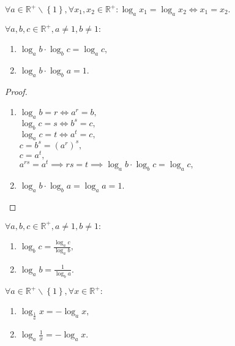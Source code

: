 \begin{veta}\label{zakl_reseni}
    $\forall a \in \mathbb R^+ \smallsetminus \left \{ 1 \right \},
    \forall x_1, x_2\in \mathbb R^+: \log_a x_1 = \log_a x_2 \iff x_1 = x_2$.
\end{veta}

\begin{veta}
    $\forall a,b,c\in \mathbb R^+, a\ne 1, b\ne 1:$
    \begin{enumerate}[$i.$]
        \item $\log_a b \cdot \log_b c = \log_a c,$
       	\item $\log_a b \cdot \log_b a = 1.$
    \end{enumerate}
\end{veta}

\begin{proof}
    \,
    \begin{enumerate}[$i.$]
        \item
            $\log_a b = r \iff a^r = b,$ \\
            $\log_b c = s \iff b^s = c,$ \\
            $\log_a c = t \iff a^t = c,$ \\
            $c =b^s=\left ( a^r \right )^s,$ \\
            $c = a^t,$ \\
            $a^{rs} = a^t \implies rs = t \implies \log_a b \cdot \log_b c = \log_a c,$
        \item $\log_a b\cdot \log_b a = \log_a a = 1.$\qedhere
    \end{enumerate}
\end{proof}

\begin{veta}
    $\forall a,b,c\in \mathbb R^+, a\ne 1, b\ne 1:$
    \begin{enumerate}[$i.$]
        \item $\log_b c = \frac{\log_a c}{\log_a b},$
       	\item $\log_a b = \frac{1}{\log_b a}.$
    \end{enumerate}
\end{veta}

\begin{veta}
    $\forall a \in \mathbb R^+ \smallsetminus \left \{ 1 \right \}  , \forall x \in \mathbb R^+:$
    \begin{enumerate}[$i.$]
        \item $\log_{\frac{1}{a}} x = -\log_a x,$
       	\item $\log_a \frac{1}{x} = -\log_a x.$
    \end{enumerate}
\end{veta}

